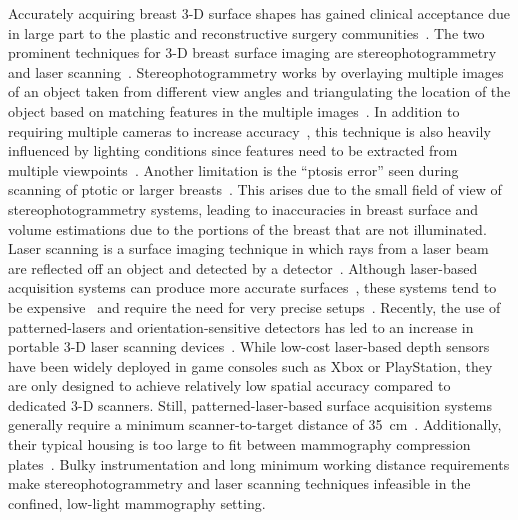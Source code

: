 Accurately acquiring breast 3-D surface shapes has gained clinical acceptance due in large part to the plastic and reconstructive surgery communities~\cite{Chang2015, Losken2005}. The two prominent techniques for 3-D breast surface imaging are stereophotogrammetry and laser scanning~\cite{Yang2015}. Stereophotogrammetry works by overlaying multiple images of an object taken from different view angles and triangulating the location of the object based on matching features in the multiple images~\cite{Ju2016, Galdino2002, FangOSA2012}. In addition to requiring multiple cameras to increase accuracy~\cite{Henseler2012}, this technique is also heavily influenced by lighting conditions since features need to be extracted from multiple viewpoints~\cite{Henseler2011}. Another limitation is the ``ptosis error'' seen during scanning of ptotic or larger breasts~\cite{Nahabedian2003}. This arises due to the small field of view of stereophotogrammetry systems, leading to inaccuracies in breast surface and volume estimations due to the portions of the breast that are not illuminated. Laser scanning is a surface imaging technique in which rays from a laser beam are reflected off an object and detected by a detector~\cite{Kovacs2006}. Although laser-based acquisition systems can produce more accurate surfaces~\cite{Kovacs2006b}, these systems tend to be expensive~\cite{Kovacs2007, Koch2011} and require the need for very precise setups~\cite{Thomson2009}. Recently, the use of patterned-lasers and orientation-sensitive detectors has led to an increase in portable 3-D laser scanning devices~\cite{Kuzminsky2012}. While low-cost laser-based depth sensors have been widely deployed in game consoles such as Xbox or PlayStation, they are only designed to achieve relatively low spatial accuracy compared to dedicated 3-D scanners. Still, patterned-laser-based surface acquisition systems generally require a minimum scanner-to-target distance of 35~cm~\cite{Ametek2002, Artec3D2022}. Additionally, their typical housing is too large to fit between mammography compression plates~\cite{Artec3D2022, Pallone2014}. Bulky instrumentation and long minimum working distance requirements make stereophotogrammetry and laser scanning techniques infeasible in the confined, low-light mammography setting. 


